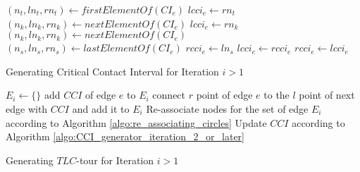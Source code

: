 \documentclass{llncs}
\begin{document}
\begin{algorithm}[h!]%
	\begin{spacing}{1}
	\begin{algorithmic}[1]
			\State $(n_t, ln_t, rn_t) \leftarrow firstElementOf(CI_e)$
			\State $lcci_e \leftarrow rn_t$
			\State $(n_k, ln_k, rn_k) \leftarrow nextElementOf(CI_e) $
					\State $lcci_e \leftarrow rn_k$
				\EndIf
				\State $(n_k, ln_k, rn_k) \leftarrow nextElementOf(CI_e) $
			\EndWhile
			\State $(n_s, ln_s, rn_s) \leftarrow lastElementOf(CI_e)$
			\State $rcci_e \leftarrow ln_s$
				\State $lcci_e \leftarrow rcci_e$
				\State $rcci_e \leftarrow lcci_e$
			\EndIf
	\end{algorithmic}
	\end{spacing}
	\caption{Generating Critical Contact Interval for Iteration $i>1$}
	\label{algo:CCI_generator_iteration_2_or_later}
\end{algorithm}
\begin{algorithm}[h!]%
	\begin{spacing}{1}
	\begin{algorithmic}[1]
			\State $E_i \leftarrow \{ \}$
				\State add $CCI$ of edge $e$ to $E_i$
				\State connect $r$ point of edge $e$ to the $l$ point of next edge with $CCI$ and add it to
				$E_i$
			\EndFor
			\State Re-associate nodes for the set of edge $E_i$ according to Algorithm
			\ref{algo:re_associating_circles}
				\State Update $CCI$ according to Algorithm \ref{algo:CCI_generator_iteration_2_or_later}
			\EndFor
	\end{algorithmic} 
	\end{spacing}
	\caption{Generating $TLC$-tour for Iteration $i>1$}
	\label{algo:tlc_tour_generator_for_iteration_i}
\end{algorithm}
\end{document}
